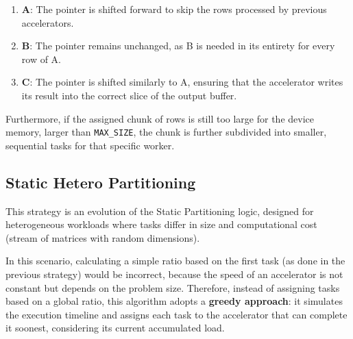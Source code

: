 \begin{enumerate}
    \item \textbf{A}: The pointer is shifted forward to skip the rows processed by previous accelerators.
    \item \textbf{B}: The pointer remains unchanged, as B is needed in its entirety for every row of A.
    \item \textbf{C}: The pointer is shifted similarly to A, ensuring that the accelerator writes its result into the correct slice of the output buffer.
\end{enumerate}

Furthermore, if the assigned chunk of rows is still too large for the device memory, larger than \texttt{MAX\_SIZE}, the chunk is further subdivided into smaller, sequential tasks for that specific worker.

\clearpage

\subsection{Static Hetero Partitioning} 
\label{implheterologic}
This strategy is an evolution of the Static Partitioning logic, designed for heterogeneous workloads where tasks differ in size and computational cost (stream of matrices with random dimensions).

In this scenario, calculating a simple ratio based on the first task (as done in the previous strategy) would be incorrect, because the speed of an accelerator is not constant but depends on the problem size. Therefore, instead of assigning tasks based on a global ratio, this algorithm adopts a \textbf{greedy approach}: it simulates the execution timeline and assigns each task to the accelerator that can complete it soonest, considering its current accumulated load.

